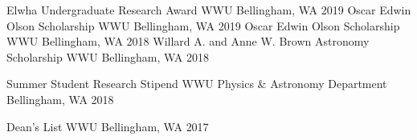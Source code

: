 



\begin{cvhonors}
  \cvhonor
    {Elwha Undergraduate Research Award} %
    {WWU} %
    {Bellingham, WA} %
    {2019} %
  \cvhonor
    {Oscar Edwin Olson Scholarship} %
    {WWU} %
    {Bellingham, WA} %
    {2019} %
  \cvhonor
    {Oscar Edwin Olson Scholarship} %
    {WWU} %
    {Bellingham, WA} %
    {2018} %
  \cvhonor
    {Willard A. and Anne W. Brown Astronomy Scholarship} %
    {WWU} %
    {Bellingham, WA} %
    {2018} %

  \cvhonor
    {Summer Student Research Stipend} %
    {WWU Physics \& Astronomy Department} %
    {Bellingham, WA} %
    {2018} %

  \cvhonor
    {Dean's List} %
    {WWU} %
    {Bellingham, WA} %
    {2017} %

\end{cvhonors}
